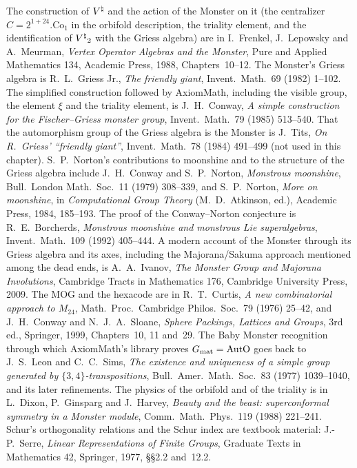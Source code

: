 The construction of ${V^{\natural}}$ and the action of the Monster on it (the centralizer $C=2^{1+24}.\mathrm{Co}_1$ in the orbifold
description, the triality element, and the identification of ${V^{\natural}}_2$ with the Griess algebra) are in I.~Frenkel,
J.~Lepowsky and A.~Meurman, \emph{Vertex Operator Algebras and the Monster}, Pure and Applied Mathematics 134, Academic Press,
1988, Chapters~10--12.  The Monster's Griess algebra is R.~L.~Griess Jr., \emph{The friendly giant}, Invent.\ Math.\ 69 (1982)
1--102.  The simplified construction followed by AxiomMath, including the visible group, the element $\xi$ and the triality
element, is J.~H.~Conway, \emph{A simple construction for the Fischer--Griess monster group}, Invent.\ Math.\ 79 (1985)
513--540.  That the automorphism group of the Griess algebra is the Monster is J.~Tits, \emph{On R.~Griess' ``friendly giant''},
Invent.\ Math.\ 78 (1984) 491--499 (not used in this chapter).  S.~P.~Norton's contributions to moonshine and to the structure
of the Griess algebra include J.~H.~Conway and S.~P.~Norton, \emph{Monstrous moonshine}, Bull.\ London Math.\ Soc.\ 11 (1979)
308--339, and S.~P.~Norton, \emph{More on moonshine}, in \emph{Computational Group Theory} (M.~D.~Atkinson, ed.), Academic Press,
1984, 185--193.  The proof of the Conway--Norton conjecture is R.~E.~Borcherds, \emph{Monstrous moonshine and monstrous Lie
superalgebras}, Invent.\ Math.\ 109 (1992) 405--444.  A modern account of the Monster through its Griess algebra and its axes,
including the Majorana/Sakuma approach mentioned among the dead ends, is A.~A.~Ivanov, \emph{The Monster Group and Majorana
Involutions}, Cambridge Tracts in Mathematics 176, Cambridge University Press, 2009.  The MOG and the hexacode are in
R.~T.~Curtis, \emph{A new combinatorial approach to $M_{24}$}, Math.\ Proc.\ Cambridge Philos.\ Soc.\ 79 (1976) 25--42, and
J.~H.~Conway and N.~J.~A.~Sloane, \emph{Sphere Packings, Lattices and Groups}, 3rd ed., Springer, 1999, Chapters~10, 11 and~29.
The Baby Monster recognition through which AxiomMath's library proves $G_{\mathrm{mat}}=\mathrm{AutO}$ goes back to J.~S.~Leon and
C.~C.~Sims, \emph{The existence and uniqueness of a simple group generated by $\{3,4\}$-transpositions}, Bull.\ Amer.\ Math.\
Soc.\ 83 (1977) 1039--1040, and its later refinements.  The physics of the orbifold and of the triality is in L.~Dixon,
P.~Ginsparg and J.~Harvey, \emph{Beauty and the beast: superconformal symmetry in a Monster module}, Comm.\ Math.\ Phys.\ 119
(1988) 221--241.  Schur's orthogonality relations and the Schur index are textbook material: J.-P.~Serre, \emph{Linear
Representations of Finite Groups}, Graduate Texts in Mathematics 42, Springer, 1977, \S\S2.2 and~12.2.

